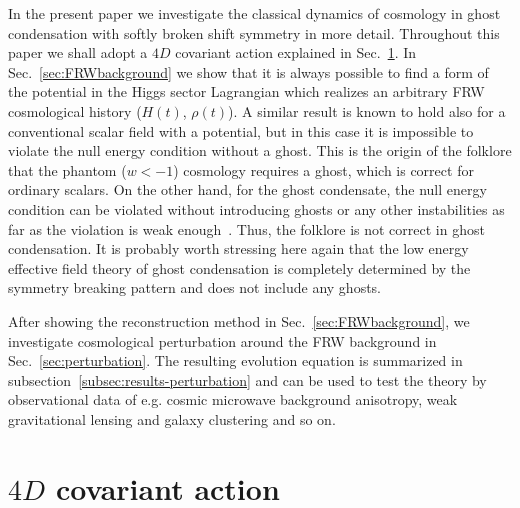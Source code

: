 In the present paper we investigate the classical dynamics of cosmology
in ghost condensation with softly broken shift symmetry in more
detail. Throughout this paper we shall adopt a $4D$ covariant action
explained in Sec.~\ref{sec:4Daction}. In Sec.~\ref{sec:FRWbackground} we
show that it is always possible to find a form of the potential in the
Higgs sector Lagrangian which realizes an arbitrary FRW cosmological
history ($H(t)$, $\rho(t)$). A similar result is known to hold also for
a conventional scalar field with a potential, but in this case it is
impossible to violate the null energy condition without a ghost. This is
the origin of the folklore that the phantom ($w<-1$) cosmology requires
a ghost, which is correct for ordinary scalars. On the other hand, for
the ghost condensate, the null energy condition can be violated without
introducing ghosts or any other instabilities as far as the violation is
weak enough~\cite{Creminelli:2006xe}. Thus, the folklore is not correct
in ghost condensation. It is probably worth stressing here again that
the low energy effective field theory of ghost condensation is
completely determined by the symmetry breaking pattern and does not
include any ghosts. 


After showing the reconstruction method in Sec.~\ref{sec:FRWbackground},
we investigate cosmological perturbation around the FRW background in
Sec.~\ref{sec:perturbation}. The resulting evolution equation is
summarized in subsection~\ref{subsec:results-perturbation} and can be
used to test the theory by observational data of e.g. cosmic microwave
background anisotropy, weak gravitational lensing and galaxy clustering
and so on.  




\section{$4D$ covariant action}
\label{sec:4Daction}


